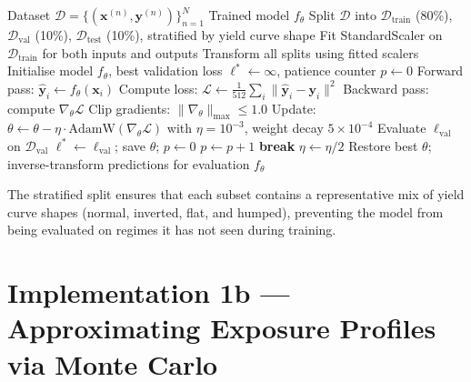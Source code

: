   \begin{algorithm}
  \caption{Training Procedure for Surrogate Model}\label{alg:training_1a}
  \begin{algorithmic}[1]
      \Require Dataset $\mathcal{D} = \{(\mathbf{x}^{(n)}, \mathbf{y}^{(n)})\}_{n=1}^{N}$
      \Ensure Trained model $f_\theta$
      \State Split $\mathcal{D}$ into $\mathcal{D}_{\text{train}}$ (80\%), $\mathcal{D}_{\text{val}}$ (10\%), $\mathcal{D}_{\text{test}}$ (10\%), stratified by yield curve shape
      \State Fit StandardScaler on $\mathcal{D}_{\text{train}}$ for both inputs and outputs
      \State Transform all splits using fitted scalers
      \State Initialise model $f_\theta$, best validation loss $\ell^* \leftarrow \infty$, patience counter $p \leftarrow 0$
              \State Forward pass: $\hat{\mathbf{y}}_i \leftarrow f_\theta(\mathbf{x}_i)$
              \State Compute loss: $\mathcal{L} \leftarrow \frac{1}{512} \sum_i \|\hat{\mathbf{y}}_i - \mathbf{y}_i\|^2$
              \State Backward pass: compute $\nabla_\theta \mathcal{L}$
              \State Clip gradients: $\|\nabla_\theta\|_{\max} \leq 1.0$
              \State Update: $\theta \leftarrow \theta - \eta \cdot \text{AdamW}(\nabla_\theta \mathcal{L})$ with $\eta = 10^{-3}$, weight decay $5 \times 10^{-4}$
          \EndFor
          \State Evaluate $\ell_{\text{val}}$ on $\mathcal{D}_{\text{val}}$
              \State $\ell^* \leftarrow \ell_{\text{val}}$; save $\theta$; $p \leftarrow 0$
          \Else
              \State $p \leftarrow p + 1$
               \textbf{break} 
              \EndIf
               $\eta \leftarrow \eta / 2$ 
              \EndIf
          \EndIf
      \EndFor
      \State Restore best $\theta$; inverse-transform predictions for evaluation
      \State \Return $f_\theta$
  \end{algorithmic}
  \end{algorithm}

  \noindent
  The stratified split ensures that each subset contains a representative mix of yield curve shapes (normal, inverted, flat, and humped), preventing the model from being evaluated on regimes
   it has not seen during training.


  \newpage
  \section{Implementation 1b --- Approximating Exposure Profiles via Monte Carlo}\label{sec:model1b}

